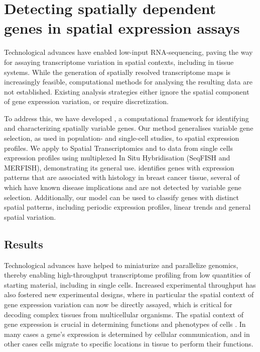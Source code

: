 
\chapter{Detecting spatially dependent genes in spatial expression assays} \label{ch:spatial}

\graphicspath{{Chapter5/Figs/}}

Technological advances have enabled low-input RNA-sequencing, paving the way for assaying transcriptome variation in spatial contexts, including in tissue systems. While the generation of spatially resolved transcriptome maps is increasingly feasible, computational methods for analysing the resulting data are not established. Existing analysis strategies either ignore the spatial component of gene expression variation, or require discretization.

To address this, we have developed , a computational framework for identifying and characterizing spatially variable genes. Our method generalises variable gene selection, as used in population- and single-cell studies, to spatial expression profiles. We apply  to Spatial Transcriptomics and to data from single cells expression profiles using multiplexed In Situ Hybridisation (SeqFISH and MERFISH), demonstrating its general use.  identifies genes with expression patterns that are associated with histology in breast cancer tissue, several of which have known disease implications and are not detected by variable gene selection. Additionally, our model can be used to classify genes with distinct spatial patterns, including periodic expression profiles, linear trends and general spatial variation. 


\section{Results}

Technological advances have helped to miniaturize and parallelize genomics, thereby enabling high-throughput transcriptome profiling from low quantities of starting material, including in single cells. Increased experimental throughput has also fostered new experimental designs, where in particular the spatial context of gene expression variation can now be directly assayed, which is critical for decoding complex tissues from multicellular organisms. The spatial context of gene expression is crucial in determining functions and phenotypes of cells \cite{Ledford2017-hq, Lee2017-om}. In many cases a gene’s expression is determined by cellular communication, and in other cases cells migrate to specific locations in tissue to perform their functions.

